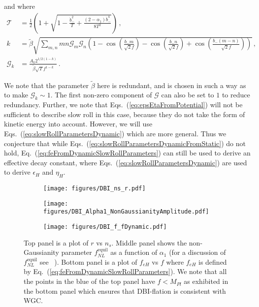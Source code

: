 \documentclass[12pt]{article}
\begin{document}
and where
\begin{align} %
  \mathcal{T} &= \frac{1}{2} \left(
      1
    + \sqrt{1 - \frac{{\dot b}_-^2}{T} + \frac{\left(2 - \alpha_1\right){\dot b}_-^4}{8 T^2}}
  \right)\,,\\
  \label{eq:dbi:beta}
  k &= \tilde\beta \sqrt{\sum_{m, n} m n \mathcal{G}_m \mathcal{G}_n \left(
      1
    - \cos\left(\frac{b_- m}{\sqrt{2} f}\right)
    - \cos\left(\frac{b_- n}{\sqrt{2} f}\right)
    + \cos\left(\frac{b_- \left(m - n\right)}{\sqrt{2} f}\right)
  \right)}\,,\\
  \mathcal{G}_k &= \frac{A_k 2^{1 / 2 \left(1 - k\right)}}{\tilde\beta \sqrt{T} f^{1 - k}}\,.
\end{align}

We note that the parameter $\tilde\beta$ here is redundant, and is chosen in such a way as to make $\mathcal{G}_k \sim 1$.
The first non-zero component of $\mathcal{G}$ can also be set to $1$ to reduce redundancy.
Further, we note that Eqs.~(\ref{eq:epsEtaFromPotential}) will not be sufficient to describe slow roll in this case, because they do not take the form of kinetic energy into account.
However, we will use Eqs.~(\ref{eq:slowRollParametersDynamic}) which are more general.
Thus we conjecture that while Eqs.~(\ref{eq:slowRollParametersDynamicFromStatic}) do not hold, Eq.~(\ref{eq:feFromDynamicSlowRollParameters}) can still be used to derive an effective decay constant, where Eqs.~(\ref{eq:slowRollParametersDynamic}) are used to derive $\epsilon_H$ and $\eta_H$.

\begin{figure}
  \centering
  \begin{subfigure}{0.5 \textwidth}
    \texttt{[image: figures/DBI\_ns\_r.pdf]}
  \end{subfigure}
  \begin{subfigure}{0.5 \textwidth}
    \texttt{[image: figures/DBI\_Alpha1\_NonGaussianityAmplitude.pdf]}
  \end{subfigure}
  \begin{subfigure}{0.5 \textwidth}
    \texttt{[image: figures/DBI\_f\_fDynamic.pdf]}
  \end{subfigure}
  \caption{\protect
    Top panel is a plot of $r$ vs $n_s$.
    Middle panel shows the non-Gaussianity parameter $f_{NL}^\text{equil}$ as a function of $\alpha_1$ (for a discussion of $f_{NL}^\text{equil}$ see ~\cite{Nath:2018xxe}).
    Bottom panel is a plot of $f_{eH}$ vs $f$ where $f_{eH}$ is defined by Eq.~(\ref{eq:feFromDynamicSlowRollParameters}).
    We note that all the points in the blue of the top panel have $f < M_{Pl}$ as exhibited in the bottom panel which ensures that DBI-flation is consistent with WGC.
  } \label{fig:DBI}
\end{figure}
\end{document}
